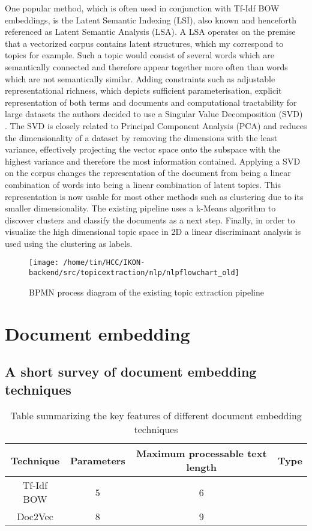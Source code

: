 One popular method, which is often used in conjunction with Tf-Idf BOW embeddings, is the Latent Semantic Indexing (LSI), also known and henceforth referenced as Latent Semantic Analysis (LSA). A LSA operates on the premise that a vectorized corpus contains latent structures, which my correspond to topics for example. Such a topic would consist of several words which are semantically connected and therefore appear together more often than words which are not semantically similar. Adding constraints such as adjustable representational richness, which depicts sufficient parameterisation, explicit representation of both terms and documents and computational tractability for large datasets the authors decided to use a Singular Value Decomposition (SVD) \cite{deerwesterIndexingLatentSemantic}. The SVD is closely related to Principal Component Analysis (PCA) and reduces the dimensionality of a dataset by removing the dimensions with the least variance, effectively projecting the vector space onto the subspace with the highest variance and therefore the most information contained. Applying a SVD on the corpus changes the representation of the document from being a linear combination of words into being a linear combination of latent topics. This representation is now usable for most other methods such as clustering due to its smaller dimensionality. The existing pipeline uses a k-Means algorithm to discover clusters and classify the documents as a next step. Finally, in order to visualize the high dimensional topic space in 2D a linear discriminant analysis is used using the clustering as labels.  



\begin{figure}[t]
	\centering
	\texttt{[image: /home/tim/HCC/IKON-backend/src/topicextraction/nlp/nlpflowchart\_old]}
	\caption{\label{pic:IKON_pipeline} BPMN process diagram of the existing topic extraction pipeline}
\end{figure}


\section{Document embedding}

\subsection{A short survey of document embedding techniques}

\begin{table}
	\centering
	\begin{tabular}{ c | c | c | c }
		\hline 
		Technique & Parameters & Maximum processable text length & Type \\ \hline
		Tf-Idf BOW & 5 & 6 \\ \hline
		Doc2Vec & 8 & 9 \\
		\hline
	\end{tabular}
	\caption{\label{tab:overview_doc_embedding} Table summarizing the key features of different document embedding techniques}
\end{table}

